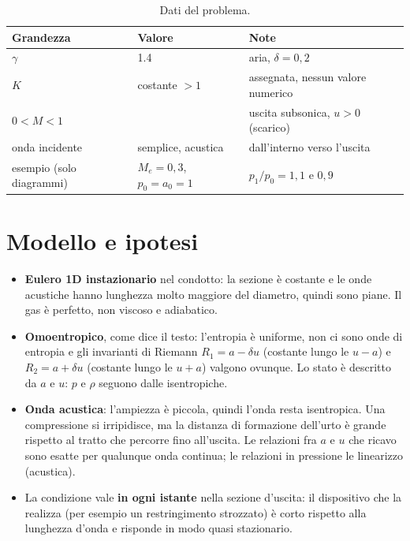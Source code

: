 \documentclass[11pt,a4paper]{article}
\newcommand{\Ru}{R_1}
\newcommand{\Rd}{R_2}
\newcommand{\uma}{u-a}
\newcommand{\upa}{u+a}
\newcommand{\Me}{M_e}
\begin{document}
\begin{table}[H]
  \centering
  \begin{tabular}{lll}
    \toprule
    Grandezza & Valore & Note \\
    \midrule
    $\gamma$ & \num{1.4} & aria, $\delta=0{,}2$ \\
    $K$ & costante $>1$ & assegnata, nessun valore numerico \\
    $0<M<1$ & & uscita subsonica, $u>0$ (scarico) \\
    onda incidente & semplice, acustica & dall'interno verso l'uscita \\
    esempio (solo diagrammi) & $\Me=0{,}3$, $p_0=a_0=1$ & $p_1/p_0=1{,}1$ e $0{,}9$ \\
    \bottomrule
  \end{tabular}
  \caption{Dati del problema.}
\end{table}

\section{Modello e ipotesi}
\begin{itemize}
  \item \textbf{Eulero 1D instazionario} nel condotto: la sezione è costante e le onde acustiche hanno lunghezza
        molto maggiore del diametro, quindi sono piane. Il gas è perfetto, non viscoso e adiabatico.
  \item \textbf{Omoentropico}, come dice il testo: l'entropia è uniforme, non ci sono onde di entropia e gli
        invarianti di Riemann $\Ru=a-\delta u$ (costante lungo le $\uma$) e $\Rd=a+\delta u$ (costante lungo le
        $\upa$) valgono ovunque. Lo stato è descritto da $a$ e $u$: $p$ e $\rho$ seguono dalle isentropiche.
  \item \textbf{Onda acustica}: l'ampiezza è piccola, quindi l'onda resta isentropica. Una compressione si
        irripidisce, ma la distanza di formazione dell'urto è grande rispetto al tratto che percorre fino
        all'uscita. Le relazioni fra $a$ e $u$ che ricavo sono esatte per qualunque onda continua; le relazioni in
        pressione le linearizzo (acustica).
  \item La condizione vale \textbf{in ogni istante} nella sezione d'uscita: il dispositivo che la realizza (per
        esempio un restringimento strozzato) è corto rispetto alla lunghezza d'onda e risponde in modo
        quasi stazionario.
\end{itemize}
\end{document}
